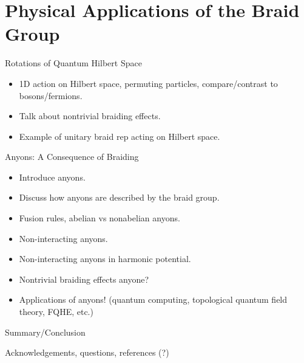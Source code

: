 \documentclass[compress,aspectratio=169,10pt,usenames,dvipsnames]{beamer}
\begin{document}


\section{Physical Applications of the Braid Group}
\begin{frame}
  \sectionpage
\end{frame}


\begin{frame}{Rotations of Quantum Hilbert Space}

\vfill

\begin{itemize}
  \item 1D action on Hilbert space, permuting particles, compare/contrast to bosons/fermions.
  \item Talk about nontrivial braiding effects.
  \item Example of unitary braid rep acting on Hilbert space.
\end{itemize}

\vfill

\end{frame}


\begin{frame}{Anyons: A Consequence of Braiding}

\begin{itemize}
  \item Introduce anyons.
  \item Discuss how anyons are described by the braid group.
  \item Fusion rules, abelian vs nonabelian anyons.
  \item Non-interacting anyons.
  \item Non-interacting anyons in harmonic potential.
  \item Nontrivial braiding effects anyone?
  \item Applications of anyons! (quantum computing, topological quantum field theory, FQHE, etc.)
\end{itemize}

\end{frame}


\begin{frame}{Summary/Conclusion}

Acknowledgements, questions, references (?)

\end{frame}

\end{document}

